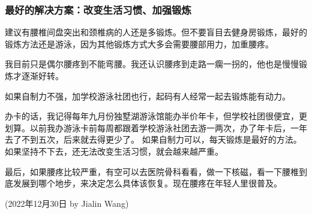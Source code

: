 










\subsubsection{最好的解决方案：改变生活习惯、加强锻炼}

建议有腰椎间盘突出和颈椎病的人还是多锻炼。但不要盲目去健身房锻炼，最好的锻炼方法还是游泳，因为其他锻炼方式大多会需要腰部用力，加重腰疼。

我目前只是偶尔腰疼到不能弯腰。我还认识腰疼到走路一瘸一拐的，他也是慢慢锻炼才逐渐好转。

如果自制力不强，加学校游泳社团也行，起码有人经常一起去锻炼能有动力。

办卡的话，我记得每年九月份独墅湖游泳馆能办半价年卡，但学校社团很便宜，更划算。以前我办游泳卡前每周都跟着学校游泳社团去游一两次，办了年卡后，一年去了不到五次，后来就去得更少了。
如果自制力可以，每天锻炼是最好的方法。
如果坚持不下去，还无法改变生活习惯，就会越来越严重。

最后，如果腰疼比较严重，有空可以去医院骨科看看，做一下核磁，看一下腰椎到底发展到哪个地步，来决定怎么具体该恢复。现在腰疼在年轻人里很普及。

\begin{flushright}
(2022年12月30日 by Jialin Wang)
\end{flushright}